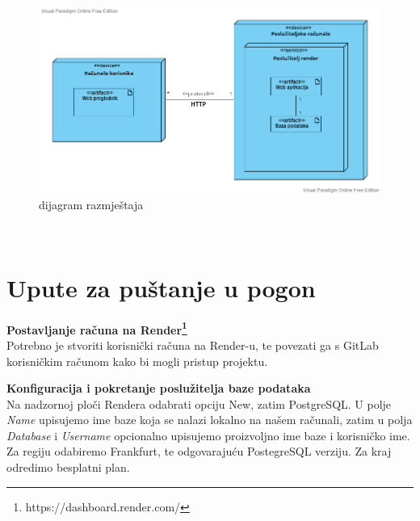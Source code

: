                 \begin{figure}[H]
                 \includegraphics[scale = 0.55]{slike/dijagramRazmjestaja.png}
                \centering
                 \caption{dijagram razmještaja}
                 \label{fig:dijagram razmještaja}
                 \end{figure}\\

                 \eject


		
            \section{Upute za puštanje u pogon}

            \textbf{Postavljanje računa na Render\footnote{https://dashboard.render.com/}} \\
            Potrebno je stvoriti korisnički računa na Render-u, te 
           povezati ga s GitLab korisničkim računom kako bi mogli pristup projektu.\\
           \newLine

    \textbf{Konfiguracija i pokretanje poslužitelja baze podataka}\\
            Na nadzornoj ploči Rendera odabrati opciju New, zatim PostgreSQL. U polje \textit{Name} upisujemo ime baze koja se nalazi lokalno na našem računali, zatim u polja \textit{Database} i \textit{Username} opcionalno  upisujemo proizvoljno ime baze i korisničko ime. Za regiju odabiremo Frankfurt, te odgovarajuću PostegreSQL verziju. Za kraj odredimo besplatni plan. \\
            \newLine
             

